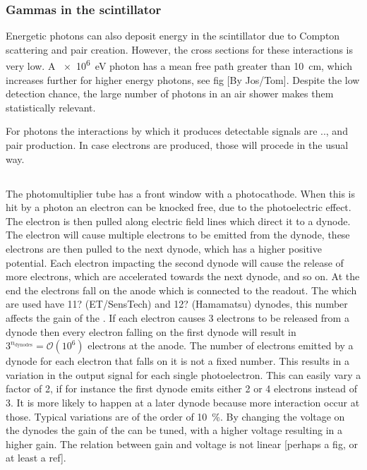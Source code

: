 \subsubsection{Gammas in the scintillator}

Energetic photons can also deposit energy in the scintillator due to Compton scattering and pair creation. However, the cross sections for these interactions is very low. A \SI{e6}{\eV} photon  has a mean free path greater than \SI{10}{\centi\meter}, which increases further for higher energy photons, see fig [By Jos/Tom]. Despite the low detection chance, the large number of photons in an air shower makes them statistically relevant.

For photons the interactions by which it produces detectable signals are .., and pair production. In case electrons are produced, those will procede in the usual way.


\subsection{\pmt}

The photomultiplier tube has a front window with a photocathode. When this is hit by a photon an electron can be knocked free, due to the photoelectric effect. The electron is then pulled along electric field lines which direct it to a dynode. The electron will cause multiple electrons to be emitted from the dynode, these electrons are then pulled to the next dynode, which has a higher positive potential. Each electron impacting the second dynode will cause the release of more electrons, which are accelerated towards the next dynode, and so on. At the end the electrons fall on the anode which is connected to the readout. The \pmts which are used have 11? (ET/SensTech) and 12? (Hamamatsu) dynodes, this number affects the gain of the \pmt. If each electron causes \num{3} electrons to be released from a dynode then every electron falling on the first dynode will result in $3^{n_{\mathrm{dynodes}}} = \mathcal{O}(10^6)$ electrons at the anode. The number of electrons emitted by a dynode for each electron that falls on it is not a fixed number. This results in a variation in the output signal for each single photoelectron. This can easily vary a factor of 2, if for instance the first dynode emits either 2 or 4 electrons instead of 3. It is more likely to happen at a later dynode because more interaction occur at those. Typical variations are of the order of \SI{10}{\percent}. By changing the voltage on the dynodes the gain of the \pmt can be tuned, with a higher voltage resulting in a higher gain. The relation between gain and voltage is not linear [perhaps a fig, or at least a ref]. 


